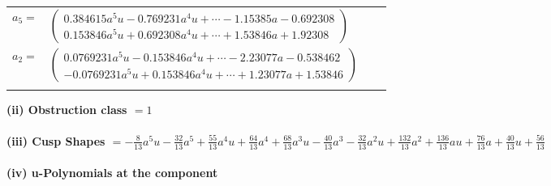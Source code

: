\documentclass[1p]{elsarticle_modified}
\theoremstyle{definition}
\begin{document}
\begin{tabular}{m{7pt} m{180pt} m{7pt} m{180pt} }
\flushright $a_{5}=$&$\begin{pmatrix}0.384615 a^{5} u-0.769231 a^{4} u+\cdots-1.15385 a-0.692308\\0.153846 a^{5} u+0.692308 a^{4} u+\cdots+1.53846 a+1.92308\end{pmatrix}$ \\
\flushright $a_{2}=$&$\begin{pmatrix}0.0769231 a^{5} u-0.153846 a^{4} u+\cdots-2.23077 a-0.538462\\-0.0769231 a^{5} u+0.153846 a^{4} u+\cdots+1.23077 a+1.53846\end{pmatrix}$\\&\end{tabular}
\flushleft \textbf{(ii) Obstruction class $= 1$}\\~\\
\flushleft \textbf{(iii) Cusp Shapes $= -\frac{8}{13} a^5 u-\frac{32}{13} a^5+\frac{55}{13} a^4 u+\frac{64}{13} a^4+\frac{68}{13} a^3 u-\frac{40}{13} a^3-\frac{32}{13} a^2 u+\frac{132}{13} a^2+\frac{136}{13} a u+\frac{76}{13} a+\frac{40}{13} u+\frac{56}{13}$}\\~\\
\newpage\renewcommand{\arraystretch}{1}
\flushleft \textbf{(iv) u-Polynomials at the component}\newline \\
\end{document}
